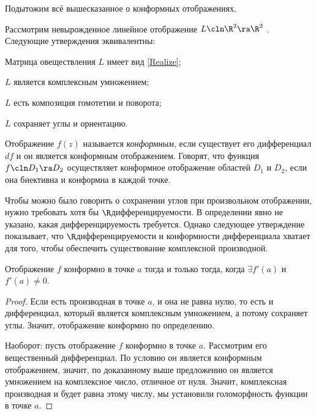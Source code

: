 \documentclass[a4paper]{article}
\begin{document}
Подытожим всё вышесказанное о конформных отображениях.

\begin{stm}
Рассмотрим невырожденное линейное отображение $L\cln \R^2 \ra \R^2$ . Следующие утверждения эквивалентны:
\begin{items}{-2}
\item Матрица овеществления $L$ имеет вид \eqref{Realize};
\item $L$ является комплексным умножением;
\item $L$ есть композиция гомотетии и поворота;
\item $L$ сохраняет углы и ориентацию.
\end{items}
\end{stm}

\begin{df}
Отображение $f(z)$ называется \emph{конформным}, если существует его дифференциал $df$ и он является
конформным отображением. Говорят, что функция $f\cln D_1 \ra D_2$ осуществляет конформное отображение
областей $D_1$ и $D_2$, если она биективна и конформна в каждой точке.
\end{df}

\begin{note}
Чтобы можно было говорить о сохранении углов при произвольном отображении, нужно требовать
хотя бы $\R$\д дифференцируемости. В определении явно не указано, какая дифференцируемость требуется.
Однако следующее утверждение показывает, что $\R$\д дифференцируемости и конформности дифференциала
хватает для того, чтобы обеспечить существование комплексной производной.
\end{note}

\begin{stm}
Отображение $f$ конформно в точке $a$ тогда и только тогда, когда $\exi f'(a)$ и $f'(a) \neq 0$.
\end{stm}
\begin{proof}
Если есть производная в точке $a$, и она не равна нулю, то есть и дифференциал, который является комплексным умножением,
а потому сохраняет углы. Значит, отображение конформно по определению.

Наоборот: пусть отображение $f$ конформно в точке $a$. Рассмотрим его вещественный дифференциал. По условию он является
конформным отображением, значит, по доказанному выше предложению он является умножением на комплексное число,
отличное от нуля. Значит, комплексная производная и будет равна этому числу,   мы установили голоморфность
функции в точке $a$.
\end{proof}
\end{document}
